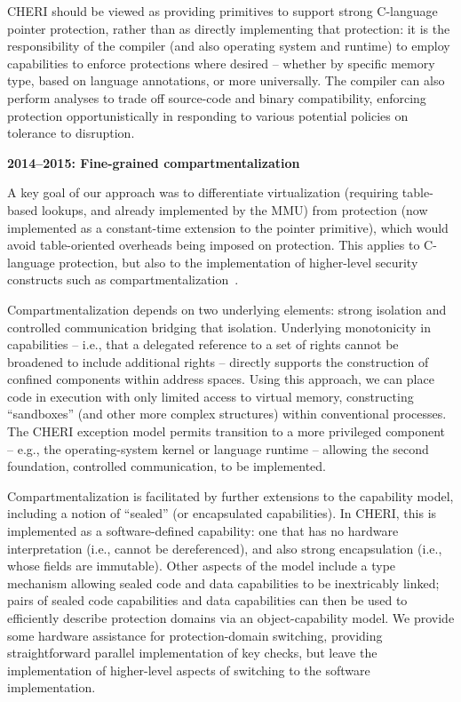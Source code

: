 CHERI should be viewed as providing primitives to support strong C-language
pointer protection, rather than as directly implementing that protection: it
is the responsibility of the compiler (and also operating system and
runtime) to employ capabilities to enforce protections where desired --
whether by specific memory type, based on language annotations, or more
universally.
The compiler can also perform analyses to trade off source-code and binary
compatibility, enforcing protection opportunistically in responding to various
potential policies on tolerance to disruption.

\medskip
\noindent
\textbf{2014--2015: Fine-grained compartmentalization}

\smallskip
\noindent
A key goal of our approach was to differentiate virtualization (requiring
table-based lookups, and already implemented by the MMU) from protection
(now implemented as a constant-time extension to the pointer primitive), which
would avoid table-oriented overheads being imposed on protection.
This applies to C-language protection, but also to the implementation of
higher-level security constructs such as
compartmentalization~\cite{watson15:cheri,watson2016:microjournal}.

Compartmentalization depends on two underlying elements: strong isolation and
controlled communication bridging that isolation.
Underlying monotonicity in capabilities -- i.e., that a delegated reference
to a set of rights cannot be broadened to include additional rights --
directly supports the construction of confined components within address
spaces.
Using this approach, we can place code in execution with only limited
access to virtual memory, constructing ``sandboxes'' (and other more complex 
structures) within conventional processes.
The CHERI exception model permits transition to a more privileged component
-- e.g., the operating-system kernel or language runtime -- allowing the
second foundation, controlled communication, to be implemented.

Compartmentalization is facilitated by further extensions to the capability
model, including a notion of ``sealed'' (or encapsulated capabilities).
In CHERI, this is implemented as a software-defined capability: one that has
no hardware interpretation (i.e., cannot be dereferenced), and also strong
encapsulation (i.e., whose fields are immutable).
Other aspects of the model include a type mechanism allowing sealed code and
data capabilities to be inextricably linked; pairs of sealed code 
capabilities and data
capabilities can then be used to efficiently describe protection domains via
an object-capability model.
We provide some hardware assistance for protection-domain switching,
providing straightforward parallel implementation of key checks, but leave
the implementation of higher-level aspects of switching to the software
implementation.

